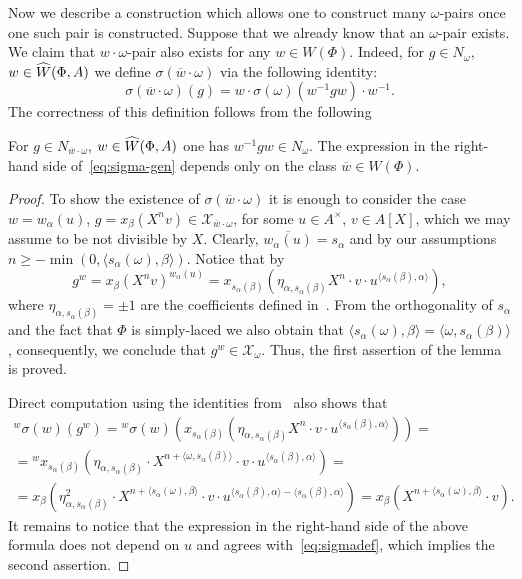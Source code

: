 Now we describe a construction which allows one to construct many $\omega$-pairs once one such pair is constructed.
Suppose that we already know that an $\omega$-pair exists.
We claim that $w \cdot \omega$-pair also exists for any $w \in W(\Phi).$
Indeed, for $g \in N_\omega$, $w \in \widehat{W}(\Phi, A)$ we define $\sigma(\overline{w} \cdot \omega)$ via the following identity:
\begin{equation} \label{eq:sigma-gen} \sigma(\overline{w} \cdot \omega)(g) = w \cdot \sigma(\omega)(w^{-1} g w) \cdot w^{-1}.\end{equation}
The correctness of this definition follows from the following
\begin{lemma} \label{lem:delta-weyl}
 For $g \in N_{\overline{w} \cdot \omega}$, $w \in \widehat{W}(\Phi, A)$ one has $w^{-1} g w \in N_\omega$.
 The expression in the right-hand side of~\eqref{eq:sigma-gen} depends only on the class $\overline{w} \in W(\Phi)$.
 \end{lemma}
\begin{proof}
To show the existence of $\sigma(\overline{w}\cdot \omega)$ it is enough to consider the case $w = w_\alpha(u)$, $g = x_\beta(X^n v) \in \mathcal{X}_{\overline{w} \cdot \omega}$, for some $u \in A^\times$, $v \in A[X]$, which we may assume to be not divisible by $X$.
Clearly, $\overline{w_\alpha(u)} = s_\alpha$ and by our assumptions $n \geq -\min(0, \langle s_\alpha(\omega), \beta \rangle)$.
Notice that by~\cite[Lemme~5.1(b)]{Ma69}
\[ g^w = x_\beta(X^n v)^{w_\alpha(u)} = x_{s_\alpha(\beta)}(\eta_{\alpha, s_\alpha(\beta)} X^{n} \cdot v \cdot u^{\langle s_\alpha(\beta), \alpha \rangle}),\]
where $\eta_{\alpha, s_\alpha(\beta)} = \pm 1$ are the coefficients defined in~\cite[Lemme~5.1]{Ma69}.
From the orthogonality of $s_\alpha$ and the fact that $\Phi$ is simply-laced we also obtain that
$\langle s_\alpha(\omega), \beta \rangle = \langle \omega, s_\alpha(\beta) \rangle$, consequently, we conclude that $g^w \in \mathcal{X}_\omega$.
Thus, the first assertion of the lemma is proved.

Direct computation using the identities from~\cite[Lemma~5.1]{Ma69} also shows that
\begin{multline*}
 {}^w\sigma(w)(g^w) = {}^w\sigma(w)(x_{s_\alpha(\beta)}(\eta_{\alpha, s_\alpha(\beta)} X^{n} \cdot v \cdot u^{\langle s_\alpha(\beta), \alpha \rangle})) = \\
   = {}^w x_{s_\alpha(\beta)}(\eta_{\alpha, s_\alpha(\beta)} \cdot X^{n + \langle \omega, s_\alpha(\beta) \rangle} \cdot v \cdot u^{\langle s_\alpha(\beta), \alpha \rangle}) = \\
     = x_{\beta}(\eta_{\alpha, s_\alpha(\beta)}^2 \cdot X^{n + \langle s_\alpha(\omega), \beta \rangle} \cdot v \cdot u^{\langle s_\alpha(\beta), \alpha \rangle - \langle s_\alpha(\beta), \alpha \rangle }) = x_{\beta}(X^{n + \langle s_\alpha(\omega), \beta \rangle} \cdot v).
\end{multline*}
It remains to notice that the expression in the right-hand side of the above formula does not depend on $u$ and agrees with~\eqref{eq:sigmadef},
 which implies the second assertion. \end{proof}

